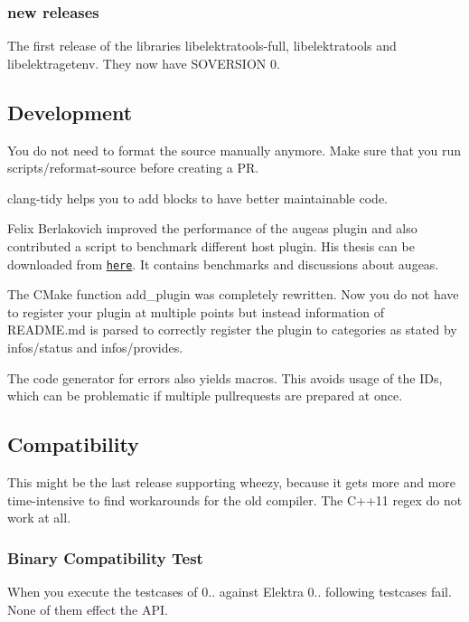 \subsubsection*{new releases}

The first release of the libraries libelektratools-\/full, libelektratools and libelektragetenv. They now have S\+O\+V\+E\+R\+S\+I\+O\+N 0.

\subsection*{Development}

You do not need to format the source manually anymore. Make sure that you run scripts/reformat-\/source before creating a P\+R.

{\ttfamily clang-\/tidy} helps you to add blocks to have better maintainable code.

Felix Berlakovich improved the performance of the augeas plugin and also contributed a script to benchmark different host plugin. His thesis can be downloaded from \href{http://www.libelektra.org/ftp/elektra/berlakovich2016universal.pdf}{\tt here}. It contains benchmarks and discussions about augeas.

The C\+Make function {\ttfamily add\+\_\+plugin} was completely rewritten. Now you do not have to register your plugin at multiple points but instead information of R\+E\+A\+D\+M\+E.\+md is parsed to correctly register the plugin to categories as stated by {\ttfamily infos/status} and {\ttfamily infos/provides}.

The code generator for errors also yields macros. This avoids usage of the I\+Ds, which can be problematic if multiple pullrequests are prepared at once.

\subsection*{Compatibility}

This might be the last release supporting wheezy, because it gets more and more time-\/intensive to find workarounds for the old compiler. The C++11 regex do not work at all.

\subsubsection*{Binary Compatibility Test}

When you execute the testcases of 0.. against Elektra 0.. following testcases fail. None of them effect the A\+P\+I.


